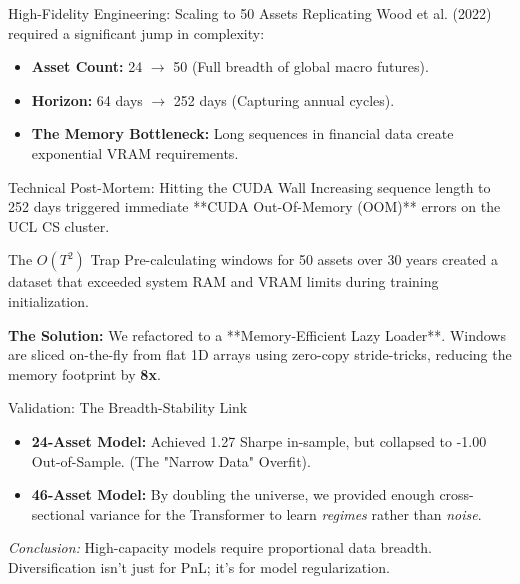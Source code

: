 \begin{frame}{High-Fidelity Engineering: Scaling to 50 Assets}
    Replicating Wood et al. (2022) required a significant jump in complexity:
    \begin{itemize}
        \item \textbf{Asset Count:} 24 $\to$ 50 (Full breadth of global macro futures).
        \item \textbf{Horizon:} 64 days $\to$ 252 days (Capturing annual cycles).
        \item \textbf{The Memory Bottleneck:} Long sequences in financial data create exponential VRAM requirements.
    \end{itemize}
\end{frame}

\begin{frame}{Technical Post-Mortem: Hitting the CUDA Wall}
    Increasing sequence length to 252 days triggered immediate **CUDA Out-Of-Memory (OOM)** errors on the UCL CS cluster.
    \begin{alertblock}{The $O(T^2)$ Trap}
        Pre-calculating windows for 50 assets over 30 years created a dataset that exceeded system RAM and VRAM limits during training initialization.
    \end{alertblock}
    \textbf{The Solution:} We refactored to a **Memory-Efficient Lazy Loader**. Windows are sliced on-the-fly from flat 1D arrays using zero-copy stride-tricks, reducing the memory footprint by \textbf{8x}.
\end{frame}

\begin{frame}{Validation: The Breadth-Stability Link}
    \begin{itemize}
        \item \textbf{24-Asset Model:} Achieved 1.27 Sharpe in-sample, but collapsed to -1.00 Out-of-Sample. (The "Narrow Data" Overfit).
        \item \textbf{46-Asset Model:} By doubling the universe, we provided enough cross-sectional variance for the Transformer to learn \textit{regimes} rather than \textit{noise}.
    \end{itemize}
    \textit{Conclusion:} High-capacity models require proportional data breadth. Diversification isn't just for PnL; it's for model regularization.
\end{frame}
